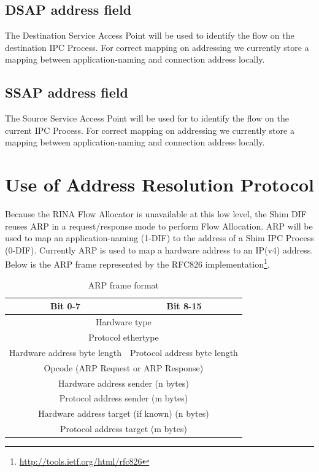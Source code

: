 \subsection{DSAP address field}

The Destination Service Access Point will be used to identify the flow on the destination IPC Process. For correct mapping on addressing we currently store a mapping between application-naming and connection address locally.

\subsection{SSAP address field}

The Source Service Access Point will be used for to identify the flow on the current IPC Process. For correct mapping on addressing we currently store a mapping between application-naming and connection address locally.

\section{Use of Address Resolution Protocol}
\label{sec:arp}

Because the RINA Flow Allocator is unavailable at this low level, the Shim DIF reuses ARP in a request/response mode to perform Flow Allocation. ARP \citep{arp1998} will be used to map an application-naming (1-DIF) to the address of a Shim IPC Process (0-DIF). Currently ARP is used to map a hardware address to an IP(v4) address. 
\\
Below is the ARP frame represented by  the RFC826 implementation\footnote{\url{http://tools.ietf.org/html/rfc826}}. 


\begin{table}[H]
	\begin{center}
		\begin{tabular}{|c|c|}
			\hline
				\textbf{Bit 0-7} & \textbf{Bit 8-15} \\ \hline
				\multicolumn{2}{|c|}{Hardware type} \\ \hline
				\multicolumn{2}{|c|}{Protocol ethertype} \\ \hline
				Hardware address byte length & Protocol address byte length \\ \hline
				\multicolumn{2}{|c|}{Opcode (ARP Request or ARP Response)} \\ \hline
				\multicolumn{2}{|c|}{Hardware address sender (n bytes)} \\ \hline
				\multicolumn{2}{|c|}{Protocol address sender (m bytes)} \\ \hline
				\multicolumn{2}{|c|}{Hardware address target (if known) (n bytes)} \\ \hline
				\multicolumn{2}{|c|}{Protocol address target (m bytes)} \\ \hline
		\end{tabular}
		\caption{ARP frame format}
	\end{center}
\end{table}

